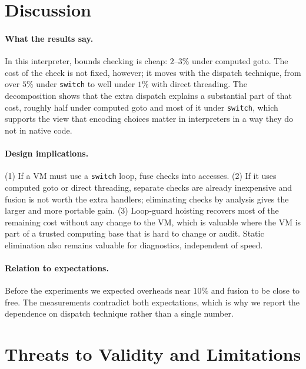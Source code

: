 \documentclass[11pt,a4paper]{article}
\begin{document}
\section{Discussion}
\paragraph{What the results say.} In this interpreter, bounds checking is cheap: $2$--$3\%$ under computed goto. The cost of the check is not fixed, however; it moves with the dispatch technique, from over $5\%$ under \texttt{switch} to well under $1\%$ with direct threading. The decomposition shows that the extra dispatch explains a substantial part of that cost, roughly half under computed goto and most of it under \texttt{switch}, which supports the view that encoding choices matter in interpreters in a way they do not in native code.

\paragraph{Design implications.} (1) If a VM must use a \texttt{switch} loop, fuse checks into accesses. (2) If it uses computed goto or direct threading, separate checks are already inexpensive and fusion is not worth the extra handlers; eliminating checks by analysis gives the larger and more portable gain. (3) Loop-guard hoisting recovers most of the remaining cost without any change to the VM, which is valuable where the VM is part of a trusted computing base that is hard to change or audit. Static elimination also remains valuable for diagnostics, independent of speed.

\paragraph{Relation to expectations.} Before the experiments we expected overheads near $10\%$ and fusion to be close to free. The measurements contradict both expectations, which is why we report the dependence on dispatch technique rather than a single number.

\section{Threats to Validity and Limitations}\label{sec:threats}
\end{document}
